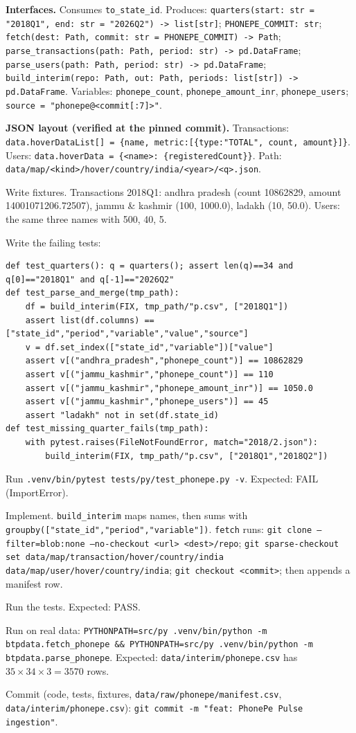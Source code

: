 \documentclass[10pt,a4paper]{article}
\newcommand{\f}[1]{\texttt{#1}}
\begin{document}
\textbf{Interfaces.} Consumes \f{to\_state\_id}. Produces:
\f{quarters(start: str = "2018Q1", end: str = "2026Q2") -> list[str]};
\f{PHONEPE\_COMMIT: str}; \f{fetch(dest: Path, commit: str = PHONEPE\_COMMIT) -> Path};
\f{parse\_transactions(path: Path, period: str) -> pd.DataFrame};
\f{parse\_users(path: Path, period: str) -> pd.DataFrame};
\f{build\_interim(repo: Path, out: Path, periods: list[str]) -> pd.DataFrame}.
Variables: \f{phonepe\_count}, \f{phonepe\_amount\_inr}, \f{phonepe\_users}; \f{source = "phonepe@<commit[:7]>"}.

\textbf{JSON layout (verified at the pinned commit).}
Transactions: \f{data.hoverDataList[] = \{name, metric:[\{type:"TOTAL", count, amount\}]\}}.
Users: \f{data.hoverData = \{<name>: \{registeredCount\}\}}. Path: \f{data/map/<kind>/hover/country/india/<year>/<q>.json}.

\begin{steps}
\item Write fixtures. Transactions 2018Q1: andhra pradesh (count 10862829, amount 14001071206.72507),
      jammu \& kashmir (100, 1000.0), ladakh (10, 50.0). Users: the same three names with 500, 40, 5.
\item Write the failing tests:
\begin{verbatim}
def test_quarters(): q = quarters(); assert len(q)==34 and q[0]=="2018Q1" and q[-1]=="2026Q2"
def test_parse_and_merge(tmp_path):
    df = build_interim(FIX, tmp_path/"p.csv", ["2018Q1"])
    assert list(df.columns) == ["state_id","period","variable","value","source"]
    v = df.set_index(["state_id","variable"])["value"]
    assert v[("andhra_pradesh","phonepe_count")] == 10862829
    assert v[("jammu_kashmir","phonepe_count")] == 110
    assert v[("jammu_kashmir","phonepe_amount_inr")] == 1050.0
    assert v[("jammu_kashmir","phonepe_users")] == 45
    assert "ladakh" not in set(df.state_id)
def test_missing_quarter_fails(tmp_path):
    with pytest.raises(FileNotFoundError, match="2018/2.json"):
        build_interim(FIX, tmp_path/"p.csv", ["2018Q1","2018Q2"])
\end{verbatim}
\item Run \f{.venv/bin/pytest tests/py/test\_phonepe.py -v}. Expected: FAIL (ImportError).
\item Implement. \f{build\_interim} maps names, then sums with \f{groupby(["state\_id","period","variable"])}.
      \f{fetch} runs: \f{git clone --filter=blob:none --no-checkout <url> <dest>/repo}; \f{git sparse-checkout set
      data/map/transaction/hover/country/india data/map/user/hover/country/india}; \f{git checkout <commit>};
      then appends a manifest row.
\item Run the tests. Expected: PASS.
\item Run on real data: \f{PYTHONPATH=src/py .venv/bin/python -m btpdata.fetch\_phonepe \&\& PYTHONPATH=src/py .venv/bin/python -m btpdata.parse\_phonepe}.
      Expected: \f{data/interim/phonepe.csv} has $35 \times 34 \times 3 = 3570$ rows.
\item Commit (code, tests, fixtures, \f{data/raw/phonepe/manifest.csv}, \f{data/interim/phonepe.csv}):
      \f{git commit -m "feat: PhonePe Pulse ingestion"}.
\end{steps}
\end{document}
